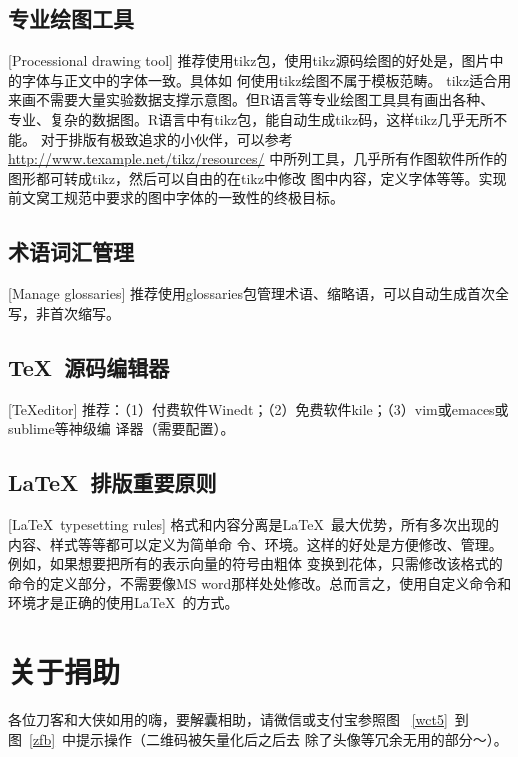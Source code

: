 \subsection{专业绘图工具}[Processional drawing tool]
\label{drawtool}
推荐使用tikz包，使用tikz源码绘图的好处是，图片中的字体与正文中的字体一致。具体如
何使用tikz绘图不属于模板范畴。
tikz适合用来画不需要大量实验数据支撑示意图。但R语言等专业绘图工具具有画出各种、
专业、复杂的数据图。R语言中有tikz包，能自动生成tikz码，这样tikz几乎无所不能。
对于排版有极致追求的小伙伴，可以参考
\href{http://www.texample.net/tikz/resources/}{http://www.texample.net/tikz/resources/}
中所列工具，几乎所有作图软件所作的图形都可转成tikz，然后可以自由的在tikz中修改
图中内容，定义字体等等。实现前文窝工规范中要求的图中字体的一致性的终极目标。


\subsection{术语词汇管理}[Manage glossaries]
推荐使用glossaries包管理术语、缩略语，可以自动生成首次全写，非首次缩写。

\subsection{\TeX\ 源码编辑器}[\TeX editor]
推荐：（1）付费软件Winedt；（2）免费软件kile；（3）vim或emaces或sublime等神级编
译器（需要配置）。

\subsection{\LaTeX\ 排版重要原则}[\LaTeX\ typesetting rules]
格式和内容分离是\LaTeX\ 最大优势，所有多次出现的内容、样式等等都可以定义为简单命
令、环境。这样的好处是方便修改、管理。例如，如果想要把所有的表示向量的符号由粗体
变换到花体，只需修改该格式的命令的定义部分，不需要像MS
word那样处处修改。总而言之，使用自定义命令和环境才是正确的使用\LaTeX\ 的方式。

\section{关于捐助}
各位刀客和大侠如用的嗨，要解囊相助，请微信或支付宝参照图
~\ref{wct5}~到图~\ref{zfb}~中提示操作（二维码被矢量化后之后去
除了头像等冗余无用的部分～）。


